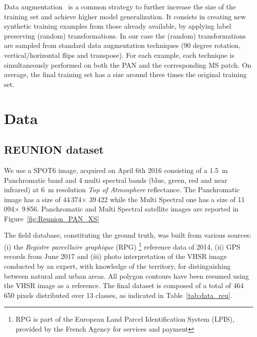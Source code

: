 \documentclass[journal]{IEEEtran}
\begin{document}
Data augmentation~\cite{abs-1712-04621} is a common strategy to further increase the size of the training set and achieve higher model generalization. It consists in creating new synthetic training examples from those already available, by applying label preserving (random) transformations. In our case the (random) transformations are sampled from standard data augmentation techniques (90 degree rotation, vertical/horizontal flips and transpose). For each example, each technique is simultaneously performed on both the PAN and the corresponding MS patch. On average, the final training set has a size around three times the original training set.


\section{Data}
\label{sec:data}
\label{sec:data}\subsection{REUNION dataset}

We use a SPOT6 image, acquired on April 6th 2016 consisting of a 1.5~m Panchromatic band and 4 multi spectral bands (blue, green, red and near infrared) at 6~m resolution \textit{Top of Atmosphere} reflectance.
The Panchromatic image has a size of 44\,374$\times$ 39\,422 while the Multi Spectral one has a size of
11\,094$\times$ 9\,856. %
Panchromatic and Multi Spectral satellite images are reported in Figure~\ref{fig:Reunion_PAN_XS}%

The field database, constituting the ground truth, was built from various sources: (i) the \textit{Registre parcellaire graphique} (RPG) \footnote{RPG is part of the European Land Parcel Identification System (LPIS), provided by the French Agency for services and payment} reference data of 2014, (ii) GPS records from June 2017 and (iii) photo interpretation of the VHSR image conducted by an expert, with knowledge of the territory, for distinguishing between natural and urban areas. All polygon contours have been resumed using the VHSR image as a reference. The final dataset is composed of a total of 464\,650 pixels  distributed over 13 classes, as indicated in Table~\ref{tab:data_reu}.
\end{document}
